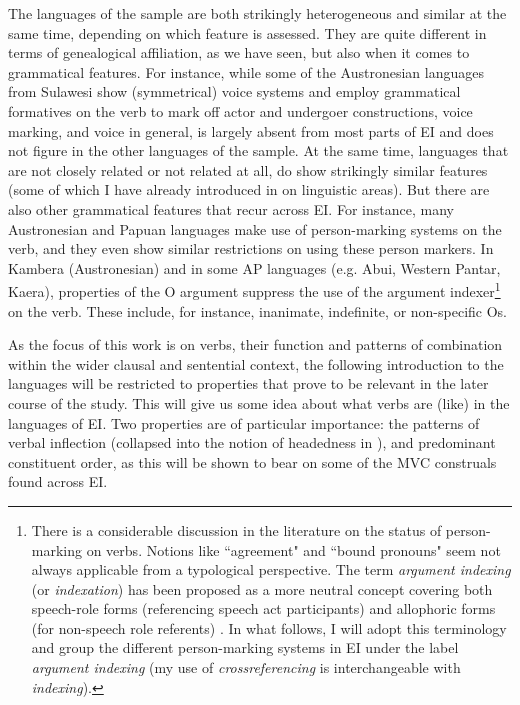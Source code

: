 The languages of the sample are both strikingly heterogeneous and similar at the same time, depending on which feature is assessed. They are quite different in terms of genealogical affiliation, as we have seen, but also when it comes to grammatical features. For instance, while some of the Austronesian languages from Sulawesi show (symmetrical) voice systems and employ grammatical formatives on the verb to mark off actor and undergoer constructions, voice marking, and voice in general, is largely absent from most parts of EI and does not figure in the other languages of the sample. At the same time, languages that are not closely related or not related at all, do show strikingly similar features (some of which I have already introduced in  on linguistic areas). But there are also other grammatical features that recur across EI. For instance, many Austronesian and Papuan languages make use of person-marking systems on the verb, and they even show similar restrictions on using these person markers. In Kambera (Austronesian) and in some AP languages (e.g. Abui, Western Pantar, Kaera), properties of the O argument suppress the use of the argument indexer\footnote{There is a considerable discussion in the literature on the status of person-marking on verbs. Notions like ``agreement" and ``bound pronouns" seem not always applicable from a typological perspective. The term \textit{argument indexing} (or \textit{indexation}) has been proposed as a more neutral concept covering both speech-role forms (referencing speech act participants) and allophoric forms (for non-speech role referents) \parencite{haspelmath2013argument}. In what follows, I will adopt this terminology and group the different person-marking systems in EI under the label \textit{argument indexing} (my use of \textit{crossreferencing} is interchangeable with \textit{indexing}).} on the verb. These include, for instance, inanimate, indefinite, or non-specific Os. 

As the focus of this work is on verbs, their function and patterns of combination within the wider clausal and sentential context, the following introduction to the languages will be restricted to properties that prove to be relevant in the later course of the study. This will give us some idea about what verbs are (like) in the languages of EI. Two properties are of particular importance: the patterns of verbal inflection (collapsed into the notion of headedness in ), and predominant constituent order, as this will be shown to bear on some of the MVC construals found across EI.

